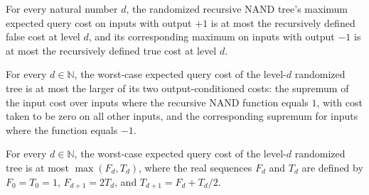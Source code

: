 \begin{theorem}
\label{FABL.recursiveNandOutputCosts_le_recurrence}
\leanok
{}
For every natural number $d$, the randomized recursive NAND tree's maximum expected
query cost on inputs with output $+1$ is at most the recursively defined false cost at
level $d$, and its corresponding maximum on inputs with output $-1$ is at most the
recursively defined true cost at level $d$.
\end{theorem}

\begin{theorem}
\label{FABL.recursiveNandRandomizedTree_worstCaseCost_le_maxOutputCost}
\leanok
{}
For every $d\in\mathbb{N}$, the worst-case expected query cost of the level-$d$
randomized tree is at most the larger of its two output-conditioned costs: the supremum
of the input cost over inputs where the recursive NAND function equals $1$, with cost
taken to be zero on all other inputs, and the corresponding supremum for inputs where
the function equals $-1$.
\end{theorem}

\begin{theorem}
\label{FABL.recursiveNandRandomizedTree_worstCaseCost_le_recurrence}
\leanok
{}
For every $d\in\mathbb{N}$, the worst-case expected query cost of the level-$d$
randomized tree is at most $\max(F_d,T_d)$, where the real sequences $F_d$ and $T_d$ are
defined by $F_0=T_0=1$, $F_{d+1}=2T_d$, and $T_{d+1}=F_d+T_d/2$.
\end{theorem}

